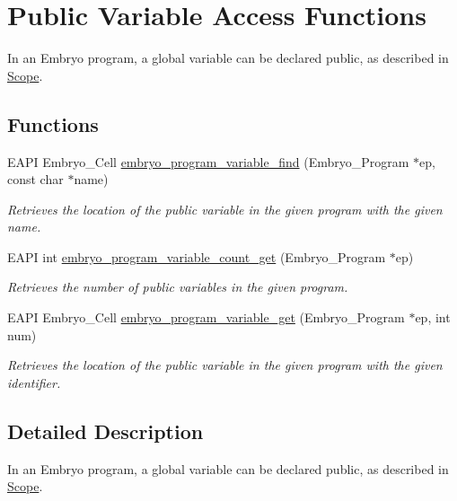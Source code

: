 \hypertarget{group__Embryo__Public__Variable__Group}{
\section{Public Variable Access Functions}
\label{group__Embryo__Public__Variable__Group}
}
In an Embryo program, a global variable can be declared public, as described in \hyperlink{Small_Page_Small_Scope_Subsection}{Scope}.  
\subsection*{Functions}
\begin{CompactItemize}
\item 
EAPI Embryo\_\-Cell \hyperlink{group__Embryo__Public__Variable__Group_g9714d1cbd46b3b0315a71c23413ad921}{embryo\_\-program\_\-variable\_\-find} (Embryo\_\-Program $\ast$ep, const char $\ast$name)
\begin{CompactList}\small\item\em Retrieves the location of the public variable in the given program with the given name. \item\end{CompactList}\item 
EAPI int \hyperlink{group__Embryo__Public__Variable__Group_g3515ce41a3a62d86b866f4cadd0c74cd}{embryo\_\-program\_\-variable\_\-count\_\-get} (Embryo\_\-Program $\ast$ep)
\begin{CompactList}\small\item\em Retrieves the number of public variables in the given program. \item\end{CompactList}\item 
EAPI Embryo\_\-Cell \hyperlink{group__Embryo__Public__Variable__Group_g9f9174d8fdde8fdca879f61df78744bb}{embryo\_\-program\_\-variable\_\-get} (Embryo\_\-Program $\ast$ep, int num)
\begin{CompactList}\small\item\em Retrieves the location of the public variable in the given program with the given identifier. \item\end{CompactList}\end{CompactItemize}


\subsection{Detailed Description}
In an Embryo program, a global variable can be declared public, as described in \hyperlink{Small_Page_Small_Scope_Subsection}{Scope}. 


